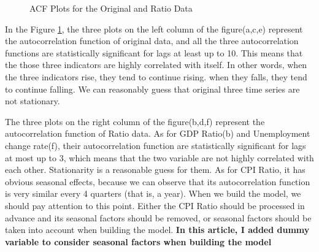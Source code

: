\documentclass{report}
\begin{document}
\begin{figure}[H]
\caption{ACF Plots for the Original and Ratio Data}
\label{Fig.acf}
\end{figure}

In the Figure \ref{Fig.acf}, the three plots on the left column of the figure(a,c,e) represent the autocorrelation function of original data, and all the three autocorrelation functions are statistically significant for lags at least up to 10. This means that the those three indicators are highly correlated with itself. In other words, when the three indicators rise, they tend to continue rising. when they falls, they tend to continue falling. We can reasonably guess that original three time series are not stationary.

The three plots on the right column of the figure(b,d,f) represent the autocorrelation function of Ratio data. As for GDP Ratio(b) and Unemployment change rate(f), their autocorrelation function are statistically significant for lags at most up to 3, which means that the two variable are not highly correlated with each other. Stationarity is a reasonable guess for them.  As for  CPI Ratio, it has obvious seasonal effects, because we can observe that its autocorrelation function is very similar every 4 quarters (that is, a year). When we build the model, we should pay attention to this point. Either the CPI Ratio should be processed in advance and its seasonal factors should be removed, or seasonal factors should be taken into account when building the model. \textbf{In this article, I added dummy variable to consider seasonal factors when building the model}
\end{document}
